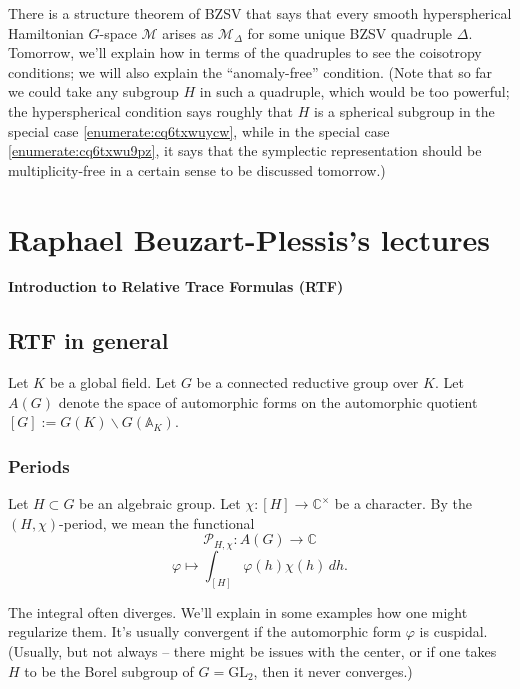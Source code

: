\documentclass[reqno]{amsart} 
\numberwithin{theorem}{section}
\numberwithin{equation}{section}
\numberwithin{exercise}{section}
\begin{document}
There is a structure theorem of BZSV that says that every smooth hyperspherical Hamiltonian $G$-space $\mathcal{M}$ arises as $\mathcal{M}_\Delta$ for some unique BZSV quadruple $\Delta$.  Tomorrow, we'll explain how in terms of the quadruples to see the coisotropy conditions; we will also explain the ``anomaly-free'' condition.  (Note that so far we could take any subgroup $H$ in such a quadruple, which would be too powerful; the hyperspherical condition says roughly that $H$ is a spherical subgroup in the special case \eqref{enumerate:cq6txwuycw}, while in the special case \eqref{enumerate:cq6txwu9pz}, it says that the symplectic representation should be multiplicity-free in a certain sense to be discussed tomorrow.)



\section{Raphael Beuzart-Plessis's lectures}\label{sec:cq6tho1cgx}
\textbf{Introduction to Relative Trace Formulas (RTF)}

\subsection{RTF in general}\label{sec:cq6tho1blx}

Let $K$ be a global field.  Let $G$ be a connected reductive group over $K$.  Let $A(G)$ denote the space of automorphic forms on the automorphic quotient $[G] := G(K) \backslash G(\mathbb{A}_K)$.

\subsubsection{Periods}\label{sec:cq6tho1auw}

Let $H \subset G$ be an algebraic group.  Let $\chi :[H] \rightarrow \mathbb{C}^\times$ be a character.  By the $(H, \chi)$-period, we mean the functional
\begin{equation*}
  \mathcal{P}_{H, \chi} : A(G) \rightarrow \mathbb{C}
\end{equation*}
\begin{equation*}
  \varphi \mapsto \int_{[H]} \varphi(h) \chi(h) \, d h.
\end{equation*}
\begin{remark}\label{remark:cq6tho091q}
  The integral often diverges.  We'll explain in some examples how one might regularize them.  It's usually convergent if the automorphic form $\varphi$ is cuspidal.  (Usually, but not always -- there might be issues with the center, or if one takes $H$ to be the Borel subgroup of $G = \mathrm{GL}_2$, then it never converges.)
\end{remark}
\end{document}
